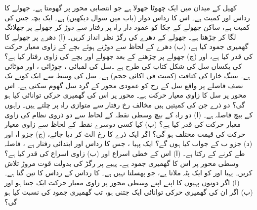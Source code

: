 کھیل کے میدان میں ایک چھوٹا جھولا ہے جو انتصابی محور پر گھومتا ہے۔  جھولے  کا رداس   اور کمیت  ہے۔ اس کا رداس دوار  (باب  میں سوال  دیکھیں)  ہے۔ ایک بچہ جس کی کمیت  ہے، ساکن جھولے کے چکا کو عمود دار راہ پر  رفتار سے دوڑ کر جھولے پر  چھلانگ لگا کر چڑھتا ہے۔ جھولے کے دھرے کی رگڑ نظر انداز کریں۔ (ا)  دھرے  پر جھولے کا گھمیری جمود کیا  ہے، (ب)    دھرے   کے لحاظ سے دوڑتے   ہوئے بچے کے زاوی  معیار حرکت کی قدر کیا ہے، اور (ج)  جھولے پر چڑھنے کے بعد جھولے اور بچے  کی زاوی رفتار کیا ہے؟
  کی یکساں سل کی شکل  کتاب کی  طرح ہے ۔سل کی لمبائی  ، چوڑائی  ، اور موٹائی  ہے۔ سنگ  خارا کی کثافت (کمیت فی اکائی حجم)   ہے۔ سل کی وسط سے ایک کونے تک نصف فاصلے پر واقع  سل کے رخ کو عمودی محور کے گرد سل گھوم سکتی ہے۔ اس محور پر سل کا   زاوی  معیار حرکت  ہے۔ محور پر اس کی گھمیری حرکی توانائی کیا ہو گی؟
دو ذرے جن کی کمیتیں  ہیں مخالف رخ  رفتار سے  متوازی راہ پر چلتے ہیں۔ راہوں کے بیچ فاصلہ  ہے۔ (ا)  دو راہ کے بیچ وسطی نقطہ کے لحاظ سے  دو ذروی نظام کی زاوی معیار حرکت کی قدر  کیا ہے؟ (ب)  کیا کسی دوسرے نقطہ کے لحاظ سے زاوی معیار حرکت  کی قیمت مختلف ہو گی؟ اگر ایک ذرے کا رخ الٹ کر دیا جائے،  (ج) جزو   ا، اور  (د) جزو  ب کے  جواب کیا ہوں گے؟
ایک پہیا ، جس کا رداس  اور ابتدائی رفتار    ہے  ،   فاصلہ طے کرنے کے   رکتا ہے۔ (ا)  اس کے خطی اسراع  اور (ب) زاوی اسراع کی قدر کیا ہے؟ وسطی محور پر اس کا گھمیری جمود  ہے۔ پہیے پر رگڑ کی بدولت قوت مروڑ تلاش کریں۔
پہیا  اور  کو  ایک پٹہ  ملاتا ہے، جو پھسلتا نہیں ہے۔  کا رداس  کے رداس کا تین گنا ہے۔ (ا) اگر دونوں پہیوں   کا اپنے اپنے وسطی محور پر زاوی معیار حرکت ایک جتنا ہو اور (ب) اگر ان کی گھمیری حرکی توانائی  ایک جتنی ہو، تب گھمیری جمود کی نسبت  کیا ہو گی؟
